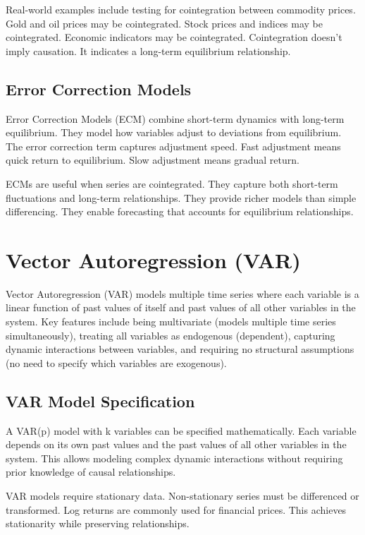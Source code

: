 Real-world examples include testing for cointegration between commodity prices. Gold and oil prices may be cointegrated. Stock prices and indices may be cointegrated. Economic indicators may be cointegrated. Cointegration doesn't imply causation. It indicates a long-term equilibrium relationship.

\subsection{Error Correction Models}

Error Correction Models (ECM) combine short-term dynamics with long-term equilibrium. They model how variables adjust to deviations from equilibrium. The error correction term captures adjustment speed. Fast adjustment means quick return to equilibrium. Slow adjustment means gradual return.

ECMs are useful when series are cointegrated. They capture both short-term fluctuations and long-term relationships. They provide richer models than simple differencing. They enable forecasting that accounts for equilibrium relationships.

\section{Vector Autoregression (VAR)}

Vector Autoregression (VAR) models multiple time series where each variable is a linear function of past values of itself and past values of all other variables in the system. Key features include being multivariate (models multiple time series simultaneously), treating all variables as endogenous (dependent), capturing dynamic interactions between variables, and requiring no structural assumptions (no need to specify which variables are exogenous).

\subsection{VAR Model Specification}

A VAR(p) model with k variables can be specified mathematically. Each variable depends on its own past values and the past values of all other variables in the system. This allows modeling complex dynamic interactions without requiring prior knowledge of causal relationships.

VAR models require stationary data. Non-stationary series must be differenced or transformed. Log returns are commonly used for financial prices. This achieves stationarity while preserving relationships.

